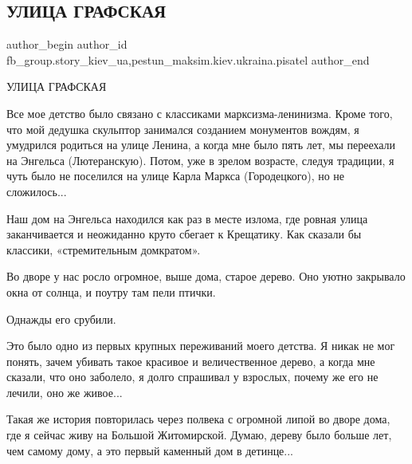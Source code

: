  
 
 
 
 
 
\subsection{УЛИЦА ГРАФСКАЯ}
\label{sec:15_01_2022.fb.fb_group.story_kiev_ua.2.ulica_grafskaja}
 
\ifcmt
 author_begin
   author_id fb_group.story_kiev_ua,pestun_maksim.kiev.ukraina.pisatel
 author_end
\fi

УЛИЦА ГРАФСКАЯ

Все мое детство было связано с классиками марксизма-ленинизма. Кроме того, что
мой дедушка скульптор занимался созданием монументов вождям, я умудрился
родиться на улице Ленина, а когда мне было пять лет, мы переехали на Энгельса
(Лютеранскую). Потом, уже в зрелом возрасте, следуя традиции, я чуть было не
поселился на улице Карла Маркса (Городецкого), но не сложилось...


Наш дом на Энгельса находился как раз в месте излома, где ровная улица
заканчивается и неожиданно круто сбегает к Крещатику. Как сказали бы классики,
«стремительным домкратом».


Во дворе у нас росло огромное, выше дома, старое дерево. Оно уютно закрывало
окна от солнца, и поутру там пели птички.

Однажды его срубили.

Это было одно из первых крупных переживаний моего детства. Я никак не мог
понять, зачем убивать такое красивое и величественное дерево, а когда мне
сказали, что оно заболело, я долго спрашивал у взрослых, почему же его не
лечили, оно же живое...

Такая же история повторилась через полвека с огромной липой во дворе дома, где
я сейчас живу на Большой Житомирской. Думаю, дереву было больше лет, чем самому
дому, а это первый каменный дом в детинце...

